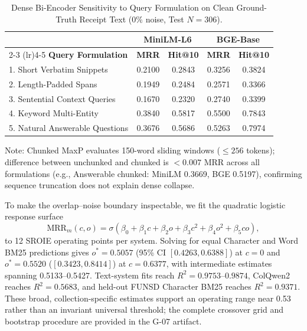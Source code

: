 \begin{table}[htbp]
\centering
\scriptsize
\caption{Dense Bi-Encoder Sensitivity to Query Formulation on Clean Ground-Truth Receipt Text ($0\%$ noise, Test $N=306$).}
\label{tab:dense_formulation_v6}
\setlength{\tabcolsep}{1.2pt}
\begin{tabular*}{\columnwidth}{@{\extracolsep{\fill}}l cccc @{}}
\toprule
 & \multicolumn{2}{c}{\textbf{MiniLM-L6}} & \multicolumn{2}{c}{\textbf{BGE-Base}} \\
\cmidrule(lr){2-3} \cmidrule(lr){4-5}
\textbf{Query Formulation} & \textbf{MRR} & \textbf{Hit@10} & \textbf{MRR} & \textbf{Hit@10} \\
\midrule
1. Short Verbatim Snippets         & 0.2100 & 0.2843 & 0.3256 & 0.3824 \\
2. Length-Padded Spans             & 0.1949 & 0.2484 & 0.2571 & 0.3366 \\
3. Sentential Context Queries      & 0.1670 & 0.2320 & 0.2740 & 0.3399 \\
4. Keyword Multi-Entity            & 0.3840 & 0.5817 & 0.5500 & 0.7843 \\
5. Natural Answerable Questions    & 0.3676 & 0.5686 & 0.5263 & 0.7974 \\
\bottomrule
\end{tabular*}
\vspace{0.5mm}\newline
\raggedright\tiny Note: Chunked MaxP evaluates 150-word sliding windows ($\le 256$ tokens); difference between unchunked and chunked is $<0.007$ MRR across all formulations (e.g., Answerable chunked: MiniLM 0.3669, BGE 0.5197), confirming sequence truncation does not explain dense collapse.
\end{table}

To make the overlap--noise boundary inspectable, we fit the quadratic logistic response surface
\begin{equation}
\mathrm{MRR}_m(c,o)=\sigma(\beta_0+\beta_1c+\beta_2o+\beta_3c^2+\beta_4o^2+\beta_5co),
\label{eq:regime_surface}
\end{equation}
to 12 SROIE operating points per system. Solving for equal Character and Word BM25 predictions gives $o^*=0.5057$ (95\% CI $[0.4263,0.6388]$) at $c=0$ and $o^*=0.5520$ ($[0.3423,0.8414]$) at $c=0.6377$, with intermediate estimates spanning 0.5133--0.5427. Text-system fits reach $R^2=0.9753$--$0.9874$, ColQwen2 reaches $R^2=0.5683$, and held-out FUNSD Character BM25 reaches $R^2=0.9371$. These broad, collection-specific estimates support an operating range near 0.53 rather than an invariant universal threshold; the complete crossover grid and bootstrap procedure are provided in the G-07 artifact.

